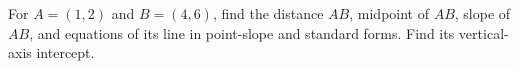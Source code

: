 For $A=(1,2)$ and $B=(4,6)$, find the distance $AB$, midpoint of $AB$, slope of $AB$, and equations of its line in point-slope and standard forms. Find its vertical-axis intercept.
